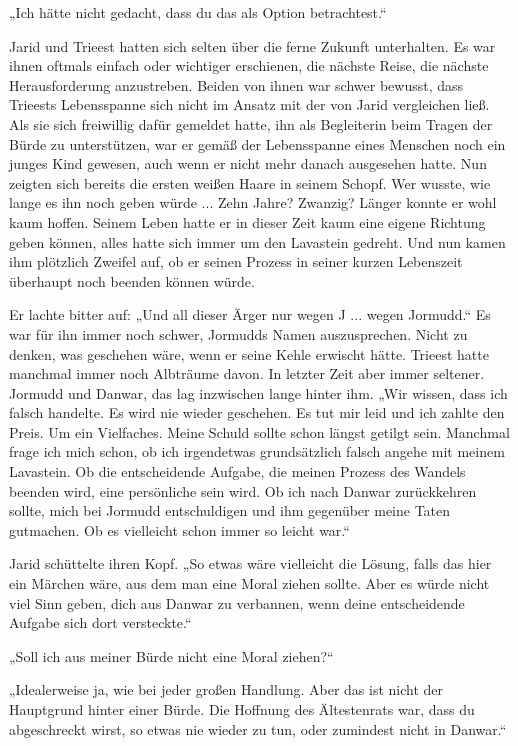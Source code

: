 „Ich hätte nicht gedacht, dass du das als Option betrachtest.“

Jarid und Trieest hatten sich selten über die ferne Zukunft unterhalten. Es war ihnen oftmals einfach oder wichtiger erschienen, die nächste Reise, die nächste Herausforderung anzustreben. Beiden von ihnen war schwer bewusst, dass Trieests Lebensspanne sich nicht im Ansatz mit der von Jarid vergleichen ließ. Als sie sich freiwillig dafür gemeldet hatte, ihn als Begleiterin beim Tragen der Bürde zu unterstützen, war er gemäß der Lebensspanne eines Menschen noch ein junges Kind gewesen, auch wenn er nicht mehr danach ausgesehen hatte. Nun zeigten sich bereits die ersten weißen Haare in seinem Schopf. Wer wusste, wie lange es ihn noch geben würde ... Zehn Jahre? Zwanzig? Länger konnte er wohl kaum hoffen. Seinem Leben hatte er in dieser Zeit kaum eine eigene Richtung geben können, alles hatte sich immer um den Lavastein gedreht. Und nun kamen ihm plötzlich Zweifel auf, ob er seinen Prozess in seiner kurzen Lebenszeit überhaupt noch beenden können würde.

Er lachte bitter auf: „Und all dieser Ärger nur wegen J ... wegen Jormudd.“ Es war für ihn immer noch schwer, Jormudds Namen auszusprechen. Nicht zu denken, was geschehen wäre, wenn er seine Kehle erwischt hätte. Trieest hatte manchmal immer noch Albträume davon. In letzter Zeit aber immer seltener. Jormudd und Danwar, das lag inzwischen lange hinter ihm. „Wir wissen, dass ich falsch handelte. Es wird nie wieder geschehen. Es tut mir leid und ich zahlte den Preis. Um ein Vielfaches. Meine Schuld sollte schon längst getilgt sein. Manchmal frage ich mich schon, ob ich irgendetwas grundsätzlich falsch angehe mit meinem Lavastein. Ob die entscheidende Aufgabe, die meinen Prozess des Wandels beenden wird, eine persönliche sein wird. Ob ich nach Danwar zurückkehren sollte, mich bei Jormudd entschuldigen und ihm gegenüber meine Taten gutmachen. Ob es vielleicht schon immer so leicht war.“

Jarid schüttelte ihren Kopf. „So etwas wäre vielleicht die Lösung, falls das hier ein Märchen wäre, aus dem man eine Moral ziehen sollte. Aber es würde nicht viel Sinn geben, dich aus Danwar zu verbannen, wenn deine entscheidende Aufgabe sich dort versteckte.“

„Soll ich aus meiner Bürde nicht eine Moral ziehen?“

„Idealerweise ja, wie bei jeder großen Handlung. Aber das ist nicht der Hauptgrund hinter einer Bürde. Die Hoffnung des Ältestenrats war, dass du abgeschreckt wirst, so etwas nie wieder zu tun, oder zumindest nicht in Danwar.“

